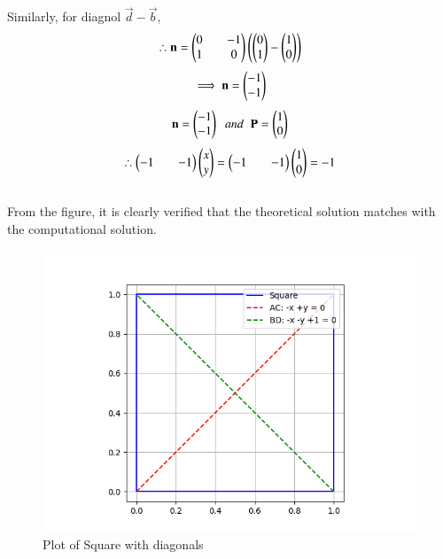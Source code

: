 \documentclass[journal]{IEEEtran}
\begin{document}
Similarly, for diagnol $\vec{d}-\vec{b}$,
\begin{align*}
    \therefore \mathbf{n}=\begin{pmatrix}0&&-1\\1&&0\end{pmatrix}\left(\begin{pmatrix}0\\1\end{pmatrix}-\begin{pmatrix}1\\0\end{pmatrix}\right)
\end{align*}
\begin{align*}
    \implies \mathbf{n}=\begin{pmatrix}-1\\-1\end{pmatrix}
\end{align*}
\begin{align*}
    \mathbf{n}=\begin{pmatrix}-1\\-1\end{pmatrix}\;\;and\;\;\mathbf{P}=\begin{pmatrix}1\\0\end{pmatrix}
\end{align*}
\begin{align*}
    \therefore \begin{pmatrix}-1&&-1\end{pmatrix}\begin{pmatrix}x\\y\end{pmatrix}=\begin{pmatrix}-1&&-1\end{pmatrix}\begin{pmatrix}1\\0\end{pmatrix}=-1
\end{align*}
\\
From the figure, it is clearly verified that the theoretical solution matches with the computational solution.\\
\begin{figure}[H]
    \centering
    \includegraphics[width=0.6\columnwidth]{figs/Figure_1.png}
    \caption*{Plot of Square with diagonals}
    \label{fig:1}
\end{figure}
\end{document}
